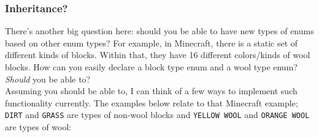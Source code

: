 \documentclass{article}
\begin{document}
\subsubsection{Inheritance?}
\indent There's another big question here: should you be able to have new types of enums based on other enum types? For example, in Minecraft, there is a static set of different kinds of blocks. Within that, they have 16 different colors/kinds of wool blocks. How can you easily declare a block type enum and a wool type enum? \emph{Should} you be able to?\\
\indent Assuming you should be able to, I can think of a few ways to implement such functionality currently. The examples below relate to that Minecraft example; \texttt{DIRT} and \texttt{GRASS} are types of non-wool blocks and \texttt{YELLOW WOOL} and \texttt{ORANGE WOOL} are types of wool:
\end{document}
